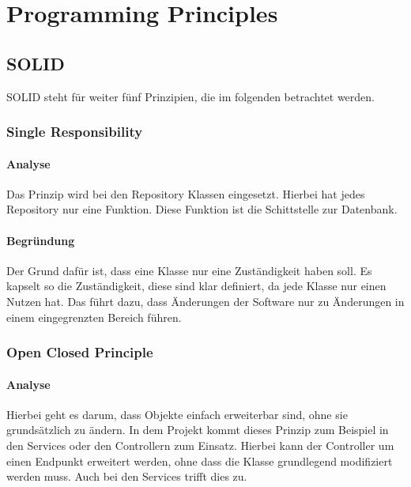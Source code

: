 
\chapter{Programming Principles}

\section{SOLID}
SOLID steht für weiter fünf Prinzipien, die im folgenden betrachtet werden.

    \subsection{Single Responsibility}
    
        \subsubsection{Analyse}
        Das Prinzip wird bei den Repository Klassen eingesetzt. Hierbei hat jedes Repository nur eine Funktion. Diese Funktion ist die Schittstelle zur Datenbank.
        
        \subsubsection{Begründung}
        Der Grund dafür ist, dass eine Klasse nur eine Zuständigkeit haben soll. Es kapselt so die Zuständigkeit, diese sind klar definiert, da jede Klasse nur einen Nutzen hat. Das führt dazu, dass Änderungen der Software nur zu Änderungen in einem eingegrenzten Bereich führen.

    \subsection{Open Closed Principle}
    
        \subsubsection{Analyse}
        Hierbei geht es darum, dass Objekte einfach erweiterbar sind, ohne sie grundsätzlich zu ändern. In dem Projekt kommt dieses Prinzip zum Beispiel in den Services oder den Controllern zum Einsatz. Hierbei kann der Controller um einen Endpunkt erweitert werden, ohne dass die Klasse grundlegend modifiziert werden muss. Auch bei den Services trifft dies zu.
        
